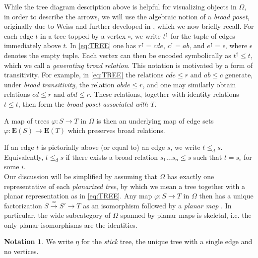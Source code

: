 \documentclass[a4paper,10pt
,draft
]{article}%
\numberwithin{equation}{section}
\numberwithin{figure}{section}
\theoremstyle{definition} %
\newtheorem{notation}[equation]{Notation}%
\newcommand{\1}{\ensuremath{\mathbbm 1}}%
\begin{document}
While the tree diagram description above is helpful for visualizing objects in $\Omega$,
in order to describe the arrows,
we will use the algebraic notion of
a \emph{broad poset},
originally due to Weiss \cite{Wei12}
and further developed in \cite{Per18},
which we now briefly recall.
%
For each edge $t$ in a tree topped by a vertex $\circ$, we write
$t^{\uparrow}$
for the tuple of edges immediately above $t$.
In \eqref{eq:TREE} one has  
$r^{\uparrow} = cde$, 
$c^\uparrow = ab$, 
and $e^\uparrow = \epsilon$,
where $\epsilon$ denotes the empty tuple.
Each vertex can then be encoded symbolically as
$t^{\uparrow} \leq t$,
which we call a 
\emph{generating broad relation}.
This notation is motivated by a form of transitivity.
For example,
in \eqref{eq:TREE}
the relations
$cde \leq r$ and $ab \leq c$
generate, under \emph{broad transitivity},
the relation $abde \leq r$,
and one may similarly obtain relations
$cd \leq r$ and $abd \leq r$.
These relations, together with identity relations $t \leq t$,
then form the \emph{broad poset associated with $T$}.


A map of trees $\varphi \colon S \to T$
in $\Omega$ is then an underlying map
of edge sets 
$\varphi \colon \boldsymbol{E}(S) \to \boldsymbol{E}(T)$
which preserves broad relations.

If an edge $t$ is pictorially above (or equal to) an edge $s$, we write $t \leq_d s$.
Equivalently, $t \leq_d s$ if there exists a broad relation $s_1\dots s_n \leq s$ such that $t = s_i$ for some $i$.\\

Our discussion will be simplified by assuming 
that $\Omega$ has exactly one representative of 
each \emph{planarized tree},
by which we mean a tree together with a planar representation as in \eqref{eq:TREE}.
Any map  
$\varphi \colon S \to T$ in $\Omega$
then has a unique factorization
$S \xrightarrow{\simeq} S' \to T$
as an isomorphism followed by a \emph{planar map}
\cite[Prop. 3.24]{BP_geo}.
In particular, the wide subcategory of $\Omega$ spanned by planar maps is skeletal,
i.e. the only planar isomorphisms are the identities.




\begin{notation}
	We write $\eta$ for the \textit{stick} tree, the unique tree with a single edge and no vertices.
\end{notation}
\end{document}
